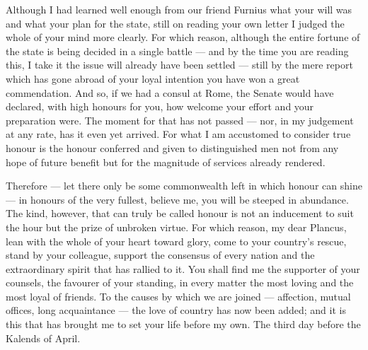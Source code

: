 

 Although I had learned well enough from our friend Furnius what your will was and what your plan for the state, still on reading your own letter I judged the whole of your mind more clearly. For which reason, although the entire fortune of the state is being decided in a single battle --- and by the time you are reading this, I take it the issue will already have been settled --- still by the mere report which has gone abroad of your loyal intention you have won a great commendation. And so, if we had a consul at Rome, the Senate would have declared, with high honours for you, how welcome your effort and your preparation were. The moment for that has not passed --- nor, in my judgement at any rate, has it even yet arrived. For what I am accustomed to consider true honour is the honour conferred and given to distinguished men not from any hope of future benefit but for the magnitude of services already rendered.

 Therefore --- let there only be some commonwealth left in which honour can shine --- in honours of the very fullest, believe me, you will be steeped in abundance. The kind, however, that can truly be called honour is not an inducement to suit the hour but the prize of unbroken virtue. For which reason, my dear Plancus, lean with the whole of your heart toward glory, come to your country's rescue, stand by your colleague, support the consensus of every nation and the extraordinary spirit that has rallied to it. You shall find me the supporter of your counsels, the favourer of your standing, in every matter the most loving and the most loyal of friends. To the causes by which we are joined --- affection, mutual offices, long acquaintance --- the love of country has now been added; and it is this that has brought me to set your life before my own. The third day before the Kalends of April.

